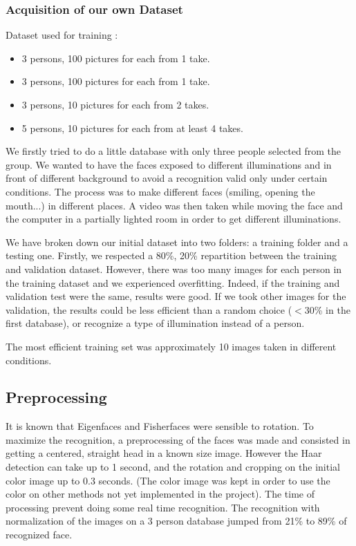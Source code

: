 \subsubsection{Acquisition of our own Dataset}
Dataset used for training :
\begin{itemize}
 \item 3 persons, 100 pictures for each from 1 take.  
\item 3 persons, 100 pictures for each from 1 take.
\item 3 persons, 10 pictures for each from 2 takes.
\item 5 persons, 10 pictures for each from at least 4 takes.
\end{itemize}
We firstly tried to do a little database with only three people selected from the group. We wanted to have the faces exposed to different illuminations and in front of different background to avoid a recognition valid only under certain conditions. The process was to make different faces (smiling, opening the mouth...) in different places. A video was then taken while moving the face and the computer in a partially lighted room in order to get different illuminations. 

We have broken down our initial dataset into two folders: a training folder and a testing one. Firstly, we respected a 80\%, 20\% repartition between the training and validation dataset. However, there was too many images for each person in the training dataset and we experienced overfitting. Indeed, if the training and validation test were the same, results were good. If we took other images for the validation, the results could be less efficient than a random choice ($<$30\% in the first database), or recognize a type of illumination instead of a person.

The most efficient training set was approximately 10 images taken in different conditions. 

\subsection{Preprocessing}
It is known that Eigenfaces and Fisherfaces were sensible to rotation. To maximize the recognition, a preprocessing of the faces was made and consisted in getting a centered, straight head in a known size image. However the Haar detection can take up to 1 second, and the rotation and cropping on the initial color image up to 0.3 seconds. (The color image was kept in order to use the color on other methods not yet implemented in the project). The time of processing prevent doing some real time recognition. The recognition with normalization of the images on a 3 person database jumped from 21\% to 89\% of recognized face.


